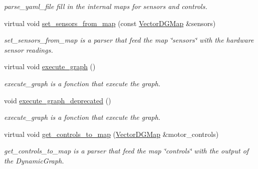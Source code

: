 \begin{DoxyCompactItemize}
\begin{DoxyCompactList}\small\item\em parse\+\_\+yaml\+\_\+file fill in the internal maps for sensors and controls. \end{DoxyCompactList}\item 
virtual void \hyperlink{classdynamic__graph_1_1Device_ab8dc9a016ebbc34521812a27b5aa6efa}{set\+\_\+sensors\+\_\+from\+\_\+map} (const \hyperlink{namespacedynamic__graph_a51212ed7fa4ae81e7b362a27f09b7ab8}{Vector\+D\+G\+Map} \&sensors)
\begin{DoxyCompactList}\small\item\em set\+\_\+sensors\+\_\+from\+\_\+map is a parser that feed the map \char`\"{}sensors\char`\"{} with the hardware sensor readings. \end{DoxyCompactList}\item 
virtual void \hyperlink{classdynamic__graph_1_1Device_adb596e7acd67089bb4929cf577b3c6ff}{execute\+\_\+graph} ()
\begin{DoxyCompactList}\small\item\em execute\+\_\+graph is a fonction that execute the graph. \end{DoxyCompactList}\item 
void \hyperlink{classdynamic__graph_1_1Device_a126268314fea8fff802fc957cbf3e0d7}{execute\+\_\+graph\+\_\+deprecated} ()
\begin{DoxyCompactList}\small\item\em execute\+\_\+graph is a fonction that execute the graph. \end{DoxyCompactList}\item 
virtual void \hyperlink{classdynamic__graph_1_1Device_a3291a91974c35f03719220e237512aa8}{get\+\_\+controls\+\_\+to\+\_\+map} (\hyperlink{namespacedynamic__graph_a51212ed7fa4ae81e7b362a27f09b7ab8}{Vector\+D\+G\+Map} \&motor\+\_\+controls)
\begin{DoxyCompactList}\small\item\em get\+\_\+controls\+\_\+to\+\_\+map is a parser that feed the map \char`\"{}controls\char`\"{} with the output of the Dynamic\+Graph. \end{DoxyCompactList}\end{DoxyCompactItemize}
